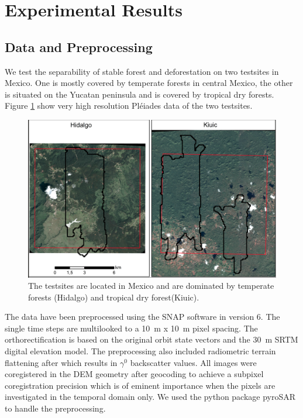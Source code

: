 \documentclass{article}
\begin{document}
\section{Experimental Results}
\subsection{Data and Preprocessing}
We test the separability of stable forest and deforestation on two testsites in Mexico.
One is mostly covered by temperate forests in central Mexico,
the other is situated on the Yucatan peninsula and is covered by tropical dry forests.
Figure \ref{testsites} show very high resolution Pléiades data of the two testsites.

\begin{figure}
  \includegraphics[width=\textwidth]{figs/SEN4REDD_testsites.png}
  \caption{The testsites are located in Mexico and are dominated by temperate forests (Hidalgo) and tropical dry forest(Kiuic).}
  \label{testsites}
\end{figure}

The data have been preprocessed using the SNAP software \cite{SNAP} in version 6.
The single time steps are multilooked to a \SI{10}{\m} x \SI{10}{\m} pixel spacing.
The orthorectification is based on the original orbit state vectors and the \SI{30}{\m} SRTM digital elevation model\cite{SRTM}.
The preprocessing also included radiometric terrain flattening after \cite{Small} which results in $\gamma^0$ backscatter values.
All images were coregistered in the DEM geometry after geocoding to achieve a subpixel coregistration precision which is of eminent importance when the pixels are investigated in the temporal domain only.
We used the python package pyroSAR \cite{pyroSAR} to handle the preprocessing.
\end{document}
